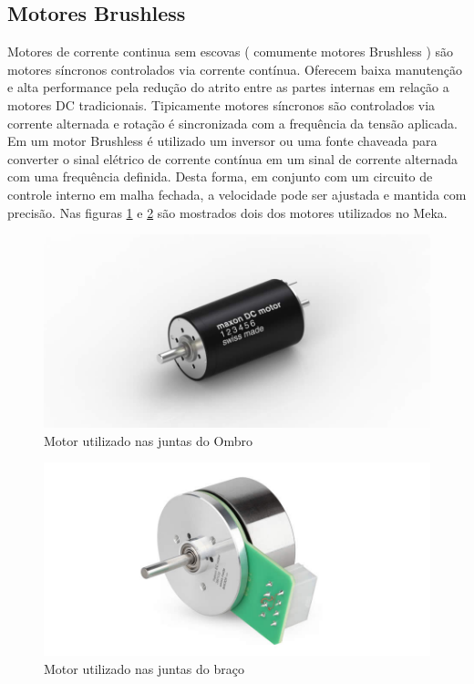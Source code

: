 


\subsection{Motores Brushless}
Motores de corrente continua sem escovas ( comumente motores Brushless ) são motores síncronos controlados via corrente contínua. Oferecem baixa manutenção e alta performance pela redução do atrito entre as partes internas em relação a motores DC tradicionais. Tipicamente motores síncronos são controlados via corrente alternada e rotação é sincronizada com a frequência da tensão aplicada. Em um motor Brushless é utilizado um inversor ou uma fonte chaveada para converter o sinal elétrico de corrente contínua em um sinal de corrente alternada com uma frequência definida. Desta forma, em conjunto com um circuito de controle interno em malha fechada, a velocidade pode ser ajustada e mantida com precisão. Nas figuras \ref{fig:maxon-servo} e \ref{fig:maxon-flat-servo} são mostrados dois dos motores utilizados no Meka. %

\begin{figure}[H]
    \centering
    \includegraphics[width = 0.5\linewidth]{figs/maxon_servo.jpg}
    \caption{Motor utilizado nas juntas do Ombro}
    \label{fig:maxon-servo}
\end{figure}

\begin{figure}[H]
    \centering
    \includegraphics[width = 0.5\linewidth]{figs/maxon_flat_servo.jpg}
    \caption{Motor utilizado nas juntas do braço}
    \label{fig:maxon-flat-servo}
\end{figure}

